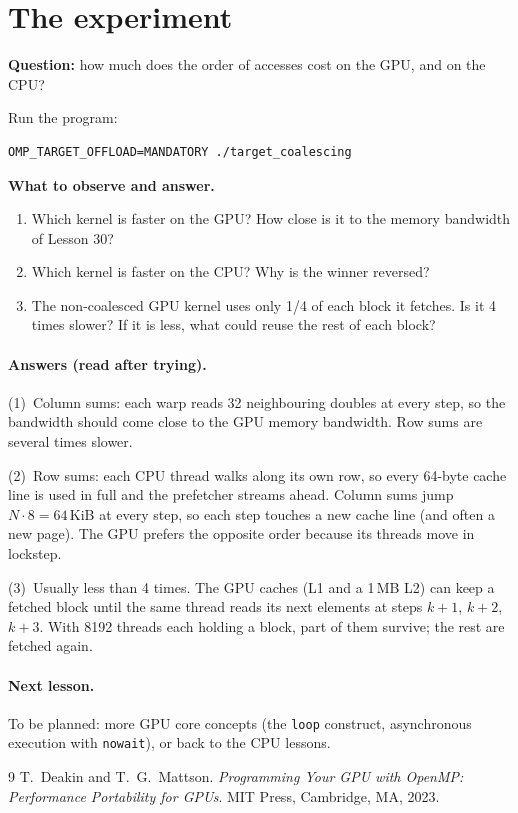 \documentclass[11pt,a4paper]{article}
\let\origtexttt\texttt
\renewcommand{\texttt}[1]{\textcolor{black!60}{\origtexttt{#1}}}
\begin{document}
\section{The experiment}
\begin{experiment}
\textbf{Question:} how much does the order of accesses cost on the GPU, and on the CPU?

Run the program:
\begin{lstlisting}[style=sh]
OMP_TARGET_OFFLOAD=MANDATORY ./target_coalescing
\end{lstlisting}

\textbf{What to observe and answer.}
\begin{enumerate}
  \item Which kernel is faster on the GPU? How close is it to the memory bandwidth of Lesson 30?
  \item Which kernel is faster on the CPU? Why is the winner reversed?
  \item The non-coalesced GPU kernel uses only 1/4 of each block it fetches. Is it 4 times
        slower? If it is less, what could reuse the rest of each block?
\end{enumerate}
\end{experiment}

\paragraph{Answers (read after trying).}

\noindent(1)~Column sums: each warp reads 32 neighbouring doubles at every step, so the
bandwidth should come close to the GPU memory bandwidth. Row sums are several times slower.

\noindent(2)~Row sums: each CPU thread walks along its own row, so every 64-byte cache line is
used in full and the prefetcher streams ahead. Column sums jump $N\cdot 8 = 64$\,KiB at every
step, so each step touches a new cache line (and often a new page). The GPU prefers the opposite
order because its threads move in lockstep.

\noindent(3)~Usually less than 4 times. The GPU caches (L1 and a 1\,MB L2) can keep a fetched
block until the same thread reads its next elements at steps $k+1$, $k+2$, $k+3$. With 8192
threads each holding a block, part of them survive; the rest are fetched again.

\paragraph{Next lesson.} To be planned: more GPU core concepts (the \texttt{loop} construct,
asynchronous execution with \texttt{nowait}), or back to the CPU lessons.

\begin{thebibliography}{9}
 T.~Deakin and T.~G.~Mattson. \emph{Programming Your GPU with OpenMP: Performance
  Portability for GPUs}. MIT Press, Cambridge, MA, 2023.
\end{thebibliography}
\end{document}
